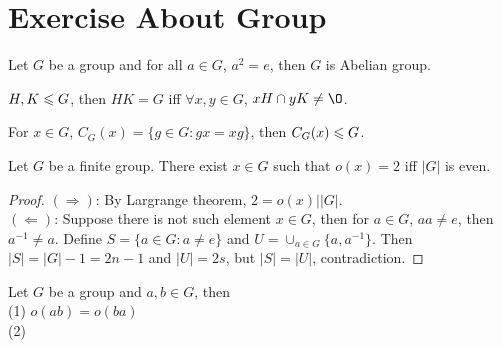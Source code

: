 \chapter{Exercise About Group}\label{chp:group_homework}


\begin{exercise}{}{}
    Let $G$ be a group and for all $a\in G$, $a^2=e$,
    then $G$ is Abelian group.
\end{exercise}


\begin{exercise}{}{}
    $H,K\leqslant G$, then $HK=G$ iff $\forall x,y\in G$, $xH\cap yK\neq \O$.
\end{exercise}

\begin{exercise}{}{}
    For $x\in G$, $C_G(x)=\{g\in G:gx=xg\}$, then $C_G(x)\leqslant G$.
\end{exercise}

\begin{exercise}{}{}
    Let $G$ be a finite group.
    There exist $x\in G$ such that $o(x)=2$ iff $|G|$ is even.
\end{exercise}

\begin{proof}
    $(\Rightarrow)$: By Largrange theorem, $2=o(x)||G|$.\\
    $(\Leftarrow)$: Suppose there is not such element $x\in G$, then for $a\in G$, $aa\neq e$, then $a^{-1}\neq a$.
    Define $S=\{a\in G:a\neq e\}$ and $ U= \cup_{a\in G}\{a,a^{-1}\}$. Then $|S|=|G|-1=2n-1$ and $|U|=2s$, but $|S|=|U|$, contradiction.  
\end{proof}

\begin{exercise}
    Let $G$ be a group and $a,b\in G$, then\\
    (1) $o(ab)=o(ba)$\\
    (2) 
\end{exercise}